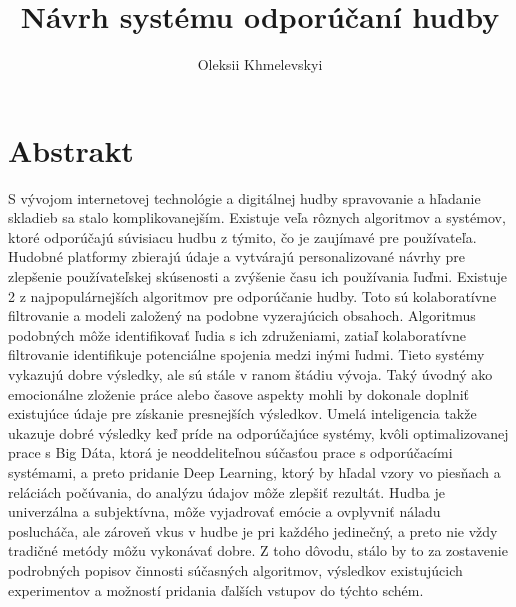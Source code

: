 \documentclass[10pt,twoside,slovak,a4paper]{article}
\title{Návrh systému odporúčaní hudby}
\author{Oleksii Khmelevskyi}
\date{}
\begin{document}
\maketitle
\section*{Abstrakt}
S vývojom internetovej technológie a digitálnej hudby spravovanie a hľadanie skladieb sa stalo komplikovanejším. Existuje veľa rôznych algoritmov a systémov, ktoré odporúčajú súvisiacu hudbu z týmito, čo je zaujímavé pre používateľa. Hudobné platformy zbierajú údaje a vytvárajú personalizované návrhy pre zlepšenie používateľskej skúsenosti a zvýšenie času ich používania ľuďmi. Existuje 2 z najpopulárnejších algoritmov pre odporúčanie hudby. Toto sú kolaboratívne filtrovanie a modeli založený na podobne vyzerajúcich obsahoch. Algoritmus podobných môže identifikovať ľudia s ich združeniami, zatiaľ kolaboratívne filtrovanie identifikuje potenciálne spojenia medzi inými ľudmi. Tieto systémy vykazujú dobre výsledky, ale sú stále v ranom štádiu vývoja. Taký úvodný ako emocionálne zloženie práce alebo časove aspekty mohli by dokonale doplniť existujúce údaje pre získanie presnejších výsledkov. Umelá inteligencia takže ukazuje dobré výsledky keď príde na odporúčajúce systémy, kvôli optimalizovanej prace s Big Dáta, ktorá je neoddeliteľnou súčasťou prace s odporúčacími systémami, a preto pridanie Deep Learning, ktorý by hľadal vzory vo piesňach a reláciách počúvania, do analýzu údajov môže zlepšiť rezultát. Hudba je univerzálna a subjektívna, môže vyjadrovať emócie a ovplyvniť náladu poslucháča, ale zároveň vkus v hudbe je pri každého jedinečný, a preto nie vždy tradičné metódy môžu vykonávať dobre. Z toho dôvodu, stálo by to za zostavenie podrobných popisov činnosti súčasných algoritmov, výsledkov existujúcich experimentov a možností pridania ďalších vstupov do týchto schém.
\end{document}
